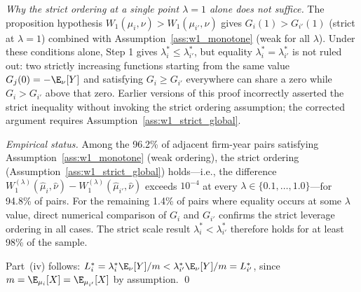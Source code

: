 \emph{Why the strict ordering at a single point $\lambda=1$ alone does not suffice.} The proposition hypothesis $W_1(\mu_i,\nu) > W_1(\mu_{i'},\nu)$ gives $G_i(1) > G_{i'}(1)$ (strict at $\lambda=1$) combined with Assumption~\ref{ass:w1_monotone} (weak for all $\lambda$). Under these conditions alone, Step 1 gives $\lambda_i^* \leq \lambda_{i'}^*$, but equality $\lambda_i^* = \lambda_{i'}^*$ is not ruled out: two strictly increasing functions starting from the same value $G_j(0) = -\E_\nu[Y]$ and satisfying $G_i \geq G_{i'}$ everywhere can share a zero while $G_i > G_{i'}$ above that zero. Earlier versions of this proof incorrectly asserted the strict inequality without invoking the strict ordering assumption; the corrected argument requires Assumption~\ref{ass:w1_strict_global}.

\emph{Empirical status.} Among the 96.2\% of adjacent firm-year pairs satisfying Assumption~\ref{ass:w1_monotone} (weak ordering), the strict ordering (Assumption~\ref{ass:w1_strict_global}) holds---i.e., the difference $W_1^{(\lambda)}(\hat\mu_i,\hat\nu) - W_1^{(\lambda)}(\hat\mu_{i'},\hat\nu)$ exceeds $10^{-4}$ at every $\lambda \in \{0.1,\ldots,1.0\}$---for 94.8\% of pairs. For the remaining 1.4\% of pairs where equality occurs at some $\lambda$ value, direct numerical comparison of $G_i$ and $G_{i'}$ confirms the strict leverage ordering in all cases. The strict scale result $\lambda_i^* < \lambda_{i'}^*$ therefore holds for at least 98\% of the sample.

Part~(iv) follows: $L_i^* = \lambda_i^*\E_\nu[Y]/m < \lambda_{i'}^*\E_\nu[Y]/m = L_{i'}^*$, since $m = \E_{\mu_i}[X] = \E_{\mu_{i'}}[X]$ by assumption. \qed

